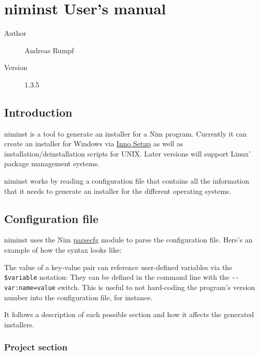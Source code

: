 \hypertarget{niminst-users-manual}{%
\section{niminst User's manual}\label{niminst-users-manual}}

\begin{description}
\item[Author]
Andreas Rumpf
\item[Version]
1.3.5
\end{description}

\hypertarget{introduction}{%
\subsection{Introduction}\label{introduction}}

niminst is a tool to generate an installer for a Nim program. Currently
it can create an installer for Windows via
\href{http://www.jrsoftware.org/isinfo.php}{Inno Setup} as well as
installation/deinstallation scripts for UNIX. Later versions will
support Linux' package management systems.

niminst works by reading a configuration file that contains all the
information that it needs to generate an installer for the different
operating systems.

\hypertarget{configuration-file}{%
\subsection{Configuration file}\label{configuration-file}}

niminst uses the Nim \href{parsecfg.html}{parsecfg} module to parse the
configuration file. Here's an example of how the syntax looks like:

The value of a key-value pair can reference user-defined variables via
the \texttt{\$variable} notation: They can be defined in the command
line with the \texttt{-\/-var:name=value} switch. This is useful to not
hard-coding the program's version number into the configuration file,
for instance.

It follows a description of each possible section and how it affects the
generated installers.

\hypertarget{project-section}{%
\subsubsection{Project section}\label{project-section}}

